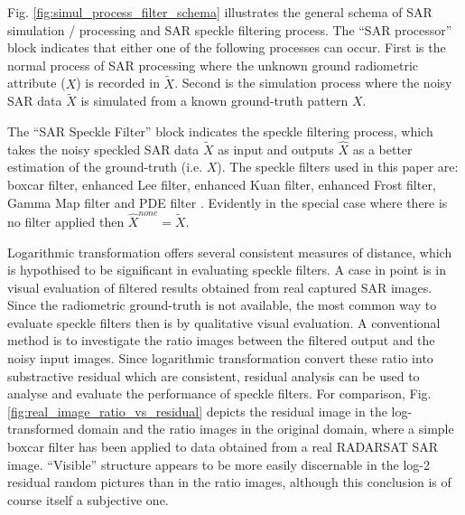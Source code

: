 \documentclass[journal]{IEEEtran}
\begin{document}
Fig. \ref{fig:simul_process_filter_schema} illustrates the general schema of SAR simulation / processing and 
SAR speckle filtering process.
The ``SAR processor'' block indicates that either one of the following processes can occur.
First is the normal process of SAR processing where the unknown ground radiometric attribute ($X$) is recorded 
in $\tilde{X}$. Second is the simulation process where the noisy SAR data $\tilde{X}$ is simulated from a known 
ground-truth pattern $X$.

The ``SAR Speckle Filter'' block indicates the speckle filtering process, 
	which takes the noisy speckled SAR data $\tilde{X}$ as input
	and outputs $\hat{X}$ as a better estimation of the ground-truth (i.e. $X$).
The speckle filters used in this paper are: 
	boxcar filter, enhanced Lee filter, enhanced Kuan filter, enhanced Frost filter, Gamma Map filter 
	and PDE filter \cite{You_TIP_2000}.
Evidently in the special case where there is no filter applied then $\hat{X}^{none} = \tilde{X}$.

Logarithmic transformation offers several consistent measures of distance, which is hypothised to be 
significant in evaluating speckle filters.
	A case in point is in visual evaluation of filtered results obtained from real captured SAR images.
Since the radiometric ground-truth is not available, %
	the most common way to evaluate speckle filters then is by qualitative visual evaluation.
A conventional method is to investigate the ratio images between the filtered output and the noisy input images.
Since logarithmic transformation convert these ratio into substractive residual which are consistent, residual 
analysis can be used to analyse and evaluate the performance of speckle filters.
For comparison, Fig. \ref{fig:real_image_ratio_vs_residual} depicts the residual image in the log-transformed domain 
and the ratio images in the original domain, where a simple boxcar filter has been applied to data obtained from a 
real RADARSAT SAR image.
``Visible'' structure appears to be more easily discernable in the log-2 residual random pictures than in 
the ratio images, although this conclusion is of course itself a subjective one.
\end{document}
